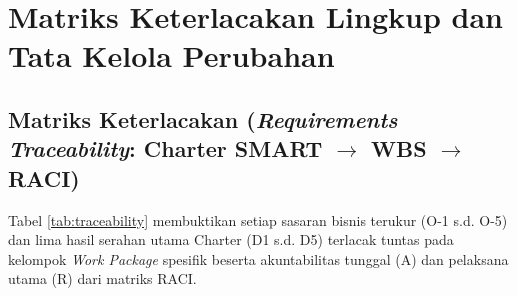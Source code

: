 \documentclass[11pt,a4paper]{article}
\begin{document}
\vspace{8pt}

\section{Matriks Keterlacakan Lingkup dan Tata Kelola Perubahan}

\subsection{Matriks Keterlacakan (\textit{Requirements Traceability}: Charter SMART $\rightarrow$ WBS $\rightarrow$ RACI)}
Tabel \ref{tab:traceability} membuktikan setiap sasaran bisnis terukur (O-1 s.d. O-5) dan lima hasil serahan utama Charter (D1 s.d. D5) terlacak tuntas pada kelompok \textit{Work Package} spesifik beserta akuntabilitas tunggal (A) dan pelaksana utama (R) dari matriks RACI.
\end{document}

